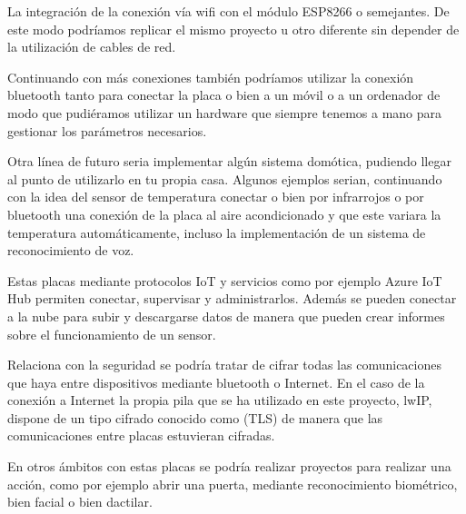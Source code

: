 \begin{description}
\item La integración de la conexión vía wifi con el módulo ESP8266 o semejantes. De este modo podríamos replicar el mismo proyecto u otro diferente sin depender de la utilización de cables de red. 
\item Continuando con más conexiones también podríamos utilizar la conexión bluetooth tanto para conectar la placa o bien a un móvil o a un ordenador de modo que pudiéramos utilizar un hardware que siempre tenemos a mano para gestionar los parámetros necesarios.
\item Otra línea de futuro seria implementar algún sistema domótica, pudiendo llegar al punto de utilizarlo en tu propia casa. Algunos ejemplos serian, continuando con la idea del sensor de temperatura conectar o bien por infrarrojos o por bluetooth una conexión de la placa al aire acondicionado y que este variara la temperatura automáticamente, incluso la implementación de un sistema de reconocimiento de voz.
\item Estas placas mediante protocolos IoT y servicios como por ejemplo Azure IoT Hub permiten conectar, supervisar y administrarlos. Además se pueden conectar a la nube para subir y descargarse datos de manera que pueden crear informes sobre el funcionamiento de un sensor.
\item Relaciona con la seguridad se podría tratar de cifrar todas las comunicaciones que haya entre dispositivos mediante bluetooth o Internet. En el caso de la conexión a Internet la propia pila que se ha utilizado en este proyecto, lwIP, dispone de un tipo cifrado conocido como  (TLS) de manera que las comunicaciones entre placas estuvieran cifradas.
\item En otros ámbitos con estas placas se podría realizar proyectos para realizar una acción, como por ejemplo abrir una puerta, mediante reconocimiento biométrico, bien facial o bien dactilar.
\end{description}

